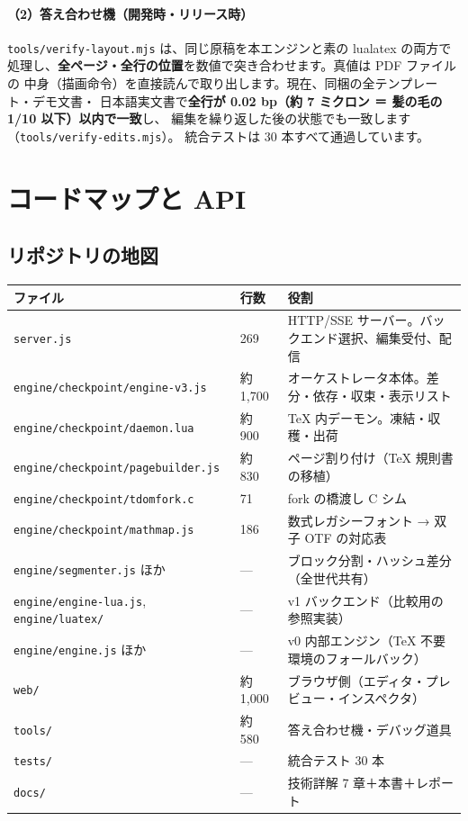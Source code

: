 \documentclass[11pt,a4paper]{ltjsarticle}
\newcommand{\code}[1]{\texttt{#1}}
\begin{document}
\paragraph{（2）答え合わせ機（開発時・リリース時）}
\code{tools/verify-layout.mjs} は、同じ原稿を本エンジンと素の lualatex の両方で
処理し、\textbf{全ページ・全行の位置}を数値で突き合わせます。真値は PDF ファイルの
中身（描画命令）を直接読んで取り出します。現在、同梱の全テンプレート・デモ文書・
日本語実文書で\textbf{全行が 0.02 bp（約 7 ミクロン ＝ 髪の毛の 1/10 以下）以内で一致}し、
編集を繰り返した後の状態でも一致します（\code{tools/verify-edits.mjs}）。
統合テストは 30 本すべて通過しています。

\section{コードマップと API}

\subsection{リポジトリの地図}

\begin{center}
\small
\begin{tabular}{llp{}}
\toprule
ファイル & 行数 & 役割 \\
\midrule
\code{server.js} & 269 & HTTP/SSE サーバー。バックエンド選択、編集受付、配信 \\
\code{engine/checkpoint/engine-v3.js} & 約 1{,}700 & オーケストレータ本体。差分・依存・収束・表示リスト \\
\code{engine/checkpoint/daemon.lua} & 約 900 & TeX 内デーモン。凍結・収穫・出荷 \\
\code{engine/checkpoint/pagebuilder.js} & 約 830 & ページ割り付け（TeX 規則書の移植） \\
\code{engine/checkpoint/tdomfork.c} & 71 & fork の橋渡し C シム \\
\code{engine/checkpoint/mathmap.js} & 186 & 数式レガシーフォント → 双子 OTF の対応表 \\
\code{engine/segmenter.js} ほか & --- & ブロック分割・ハッシュ差分（全世代共有） \\
\code{engine/engine-lua.js}, \code{engine/luatex/} & --- & v1 バックエンド（比較用の参照実装） \\
\code{engine/engine.js} ほか & --- & v0 内部エンジン（TeX 不要環境のフォールバック） \\
\code{web/} & 約 1{,}000 & ブラウザ側（エディタ・プレビュー・インスペクタ） \\
\code{tools/} & 約 580 & 答え合わせ機・デバッグ道具 \\
\code{tests/} & --- & 統合テスト 30 本 \\
\code{docs/} & --- & 技術詳解 7 章＋本書＋レポート \\
\bottomrule
\end{tabular}
\end{center}
\end{document}
